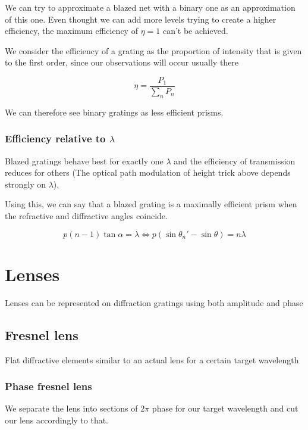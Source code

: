 \documentclass[../main/main.tex]{subfiles}
\begin{document}
 We can try to approximate a blazed net with a binary one as an approximation of this one. Even thought we can add more levels trying to create a higher efficiency, the maximum efficiency of $\eta = 1$ can't be achieved.

 We consider the efficiency of a grating as the proportion of intensity that is given to the first order, since our observations will occur usually there

 \begin{equation}
 \eta = \frac{P_{1}} {\sum_{n} P_{n}}
 \end{equation}

 We can therefore see binary gratings as less efficient prisms.

 \subsubsection*{Efficiency relative to $\lambda$}

 Blazed gratings behave best for exactly one $\lambda$ and the efficiency of transmission reduces for others (The optical path modulation of height trick above depends strongly on $\lambda$).

 Using this, we can say that a blazed grating is a maximally efficient prism when the refractive and diffractive angles coincide.

 \begin{equation}
 p (n - 1) \tan \alpha = \lambda \iff p (\sin \theta_{n}' - \sin \theta) = n \lambda
 \end{equation}


 \section{Lenses}

 Lenses can be represented on diffraction gratings using both amplitude and phase

\subsection{Fresnel lens}

Flat diffractive elements similar to an actual lens for a certain target wavelength

\subsubsection{Phase fresnel lens}

We separate the lens into sections of $2\pi$ phase for our target wavelength and cut our lens accordingly to that.
\end{document}
